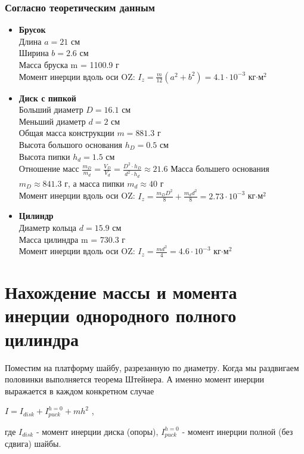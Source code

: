 \documentclass[10px]{article}
\begin{document}
\subsubsection{Согласно теоретическим данным}
\begin{itemize}
    \item \textbf{Брусок} \\
        Длина $a = 21$ см \\
        Ширина $b = 2.6$ см \\
        Масса бруска m = 1100.9 г \\
        Момент инерции вдоль оси OZ: $I_z = \frac{m}{12}(a^2 + b^2) = 4.1\cdot10^{-3}$ кг$\cdot$м$^2$
    \item \textbf{Диск с пипкой} \\
        Больший диаметр $D = 16.1$ см \\
        Меньший диаметр $d = 2$ см \\
        Общая масса конструкции $m = 881.3$ г \\
        Высота большого основания $h_D = 0.5$ см\\
        Высота пипки $h_d = 1.5$ см \\
        Отношение масс $\frac{m_D}{m_d} = \frac{V_D}{V_d} = \frac{D^2 \cdot h_D}{d^2 \cdot h_d} \approx 21.6$ \Rightarrow Масса большего основания $m_D \approx 841.3$ г, а масса пипки $m_d \approx 40 $ г \\
        Момент инерции вдоль оси OZ: $I_z = \frac{m_D D^2}{8} + \frac{m_d d^2}{8} = 2.73 \cdot 10^{-3}$ кг$\cdot$м$^2$
    \item \textbf{Цилиндр} \\
        Диаметр кольца $d = 15.9$ см\\
        Масса цилиндра m = 730.3 г \\
        Момент инерции вдоль оси OZ: $I_z = \frac{md^2}{4} = 4.6 \cdot 10^{-3}$ кг$\cdot$м$^2$
    
\end{itemize}

\section{Нахождение массы и момента инерции однородного полного цилиндра}
Поместим на платформу шайбу, разрезанную по диаметру. Когда мы раздвигаем половинки выполняется теорема Штейнера. А именно момент инерции выражается в каждом конкретном случае
\begin{center}
$I = I_{disk} + I^{h = 0}_{puck} + mh^2$ ,  
\end{center}
где $I_{disk}$ - момент инерции диска (опоры), $I^{h = 0}_{puck}$ - момент инерции полной (без сдвига) шайбы. \\
\end{document}
